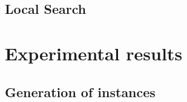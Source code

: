 \documentclass{article}
\begin{document}
\subsection{ Local Search}

    
    

\section{ Experimental results}
\label{comp_exp}


\subsection{Generation of instances}
\end{document}

